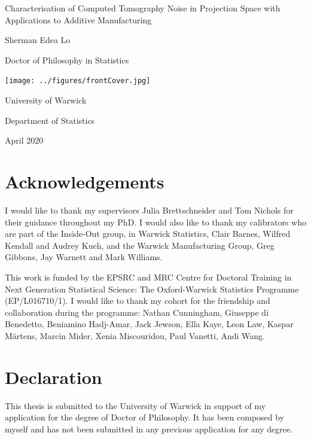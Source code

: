 \documentclass[12pt, a4paper, twoside]{memoir}
\begin{document}
\sloppy

%

\begin{titlingpage}
\centering
{\LARGE Characterisation of Computed Tomography Noise in Projection Space with Applications to Additive Manufacturing \par}
\vspace{1cm}
{\Large Sherman Edea Lo\par}
{\Large Doctor of Philosophy in Statistics\par}
\vfill
\texttt{[image: ../figures/frontCover.jpg]}
\vfill
{\Large University of Warwick\par}
{\Large Department of Statistics\par}
{\Large April 2020\par}
\end{titlingpage}


\frontmatter

\cleardoublepage
\tableofcontents*
\cleardoublepage
\listoffigures
\cleardoublepage
\listoftables

\chapter{Acknowledgements}
I would like to thank my supervisors Julia Brettschneider and Tom Nichols for their guidance throughout my PhD. I would also like to thank my calibrators who are part of the Inside-Out group, in Warwick Statistics, Clair Barnes, Wilfred Kendall and Audrey Kueh, and the Warwick Manufacturing Group, Greg Gibbons, Jay Warnett and Mark Williams.

This work is funded by the EPSRC and MRC Centre for Doctoral Training in Next Generation Statistical Science: The Oxford-Warwick Statistics Programme (EP/L016710/1). I would like to thank my cohort for the friendship and collaboration during the programme: Nathan Cunningham, Giuseppe di Benedetto, Beniamino Hadj-Amar, Jack Jewson, Ella Kaye, Leon Law, Kaspar M\"{a}rtens, Marcin Mider, Xenia Miscouridou, Paul Vanetti, Andi Wang.

\chapter{Declaration}
This thesis is submitted to the University of Warwick in support of my application for the degree of Doctor of Philosophy. It has been composed by myself and has not been submitted in any previous application for any degree.
\end{document}
